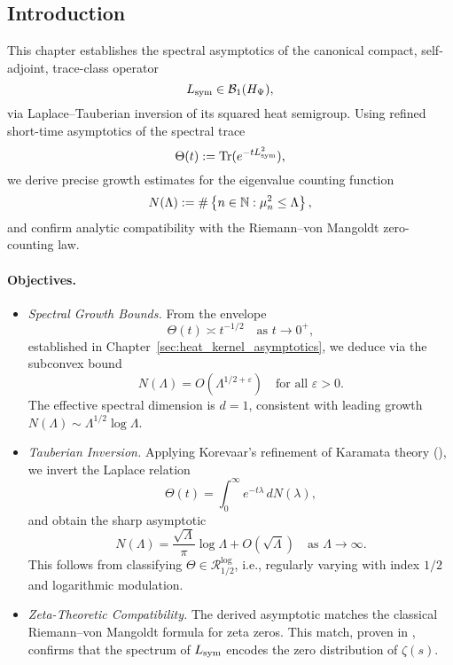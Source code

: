 \subsection*{Introduction}
\label{sec:intro_tauberian_growth}

This chapter establishes the spectral asymptotics of the canonical compact, self-adjoint, trace-class operator
\[
L_{\mathrm{sym}} \in \mathcal{B}_1(H_{\Psi}),
\]
via Laplace–Tauberian inversion of its squared heat semigroup. Using refined short-time asymptotics of the spectral trace
\[
\Theta(t) := \operatorname{Tr}(e^{-t L_{\mathrm{sym}}^2}),
\]
we derive precise growth estimates for the eigenvalue counting function
\[
N(\Lambda) := \#\left\{ n \in \mathbb{N} : \mu_n^2 \le \Lambda \right\},
\]
and confirm analytic compatibility with the Riemann–von Mangoldt zero-counting law.

\paragraph{Objectives.}
\begin{itemize}
  \item \textit{Spectral Growth Bounds.}  
  From the envelope
  \[
  \Theta(t) \asymp t^{-1/2} \quad \text{as } t \to 0^+,
  \]
  established in Chapter~\ref{sec:heat_kernel_asymptotics}, we deduce via  the subconvex bound
  \[
  N(\Lambda) = O(\Lambda^{1/2+\varepsilon}) \quad \text{for all } \varepsilon > 0.
  \]
  The effective spectral dimension is \( d = 1 \), consistent with leading growth \( N(\Lambda) \sim \Lambda^{1/2} \log \Lambda \).

  \item \textit{Tauberian Inversion.}  
  Applying Korevaar’s refinement of Karamata theory (), we invert the Laplace relation
  \[
  \Theta(t) = \int_0^\infty e^{-t\lambda} \, dN(\lambda),
  \]
  and obtain the sharp asymptotic
  \[
  N(\Lambda) = \frac{\sqrt{\Lambda}}{\pi} \log \Lambda + O(\sqrt{\Lambda}) \quad \text{as } \Lambda \to \infty.
  \]
  This follows from classifying \( \Theta \in \mathcal{R}_{1/2}^{\log} \), i.e., regularly varying with index \( 1/2 \) and logarithmic modulation.

  \item \textit{Zeta-Theoretic Compatibility.}  
  The derived asymptotic matches the classical Riemann–von Mangoldt formula for zeta zeros. This match, proven in , confirms that the spectrum of \( L_{\mathrm{sym}} \) encodes the zero distribution of \( \zeta(s) \).
\end{itemize}

